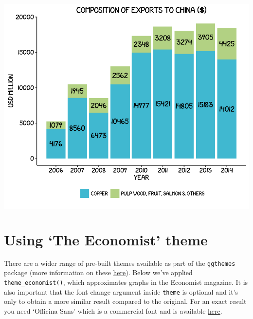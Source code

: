 \begin{Shaded}
\begin{Highlighting}[]
    \NormalTok{, }\NormalTok{, }
     \NormalTok{(),}
     \NormalTok{(),}
     \NormalTok{(), } \NormalTok{(), }
     \NormalTok{(),}
    \NormalTok{(}\NormalTok{), }
    \NormalTok{(}\NormalTok{)) }
\end{Highlighting}
\end{Shaded}

\begin{center}\includegraphics[width=0.6\linewidth]{3_Bar_Plots_pdf/bar_10-1} \end{center}

\section{\texorpdfstring{Using `The Economist'
theme}{Using The Economist theme}}\label{using-the-economist-theme}

There are a wider range of pre-built themes available as part of the
\texttt{ggthemes} package (more information on these
\href{https://cran.r-project.org/web/packages/ggthemes/vignettes/ggthemes.html}{here}).
Below we've applied \texttt{theme\_economist()}, which approximates
graphs in the Economist magazine. It is also important that the font
change argument inside \texttt{theme} is optional and it's only to
obtain a more similar result compared to the original. For an exact
result you need `Officina Sans' which is a commercial font and is
available \href{http://www.myfonts.com/fonts/itc/officina-sans/}{here}.

